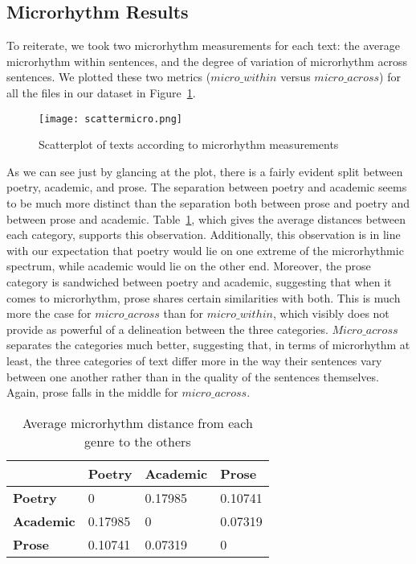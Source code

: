 \documentclass[pageno]{jpaper}
\begin{document}
\subsection{Microrhythm Results}
To reiterate, we took two microrhythm measurements for each text: the average microrhythm within sentences, and the degree of variation of microrhythm across sentences. We plotted these two metrics ($micro\_within$ versus $micro\_across$) for all the files in our dataset in Figure~\ref{fig:scattermicro}. 

\begin{figure}[hbt]
\centering
\texttt{[image: scattermicro.png]}
\caption{Scatterplot of texts according to microrhythm measurements}
\label{fig:scattermicro}
\end{figure}

As we can see just by glancing at the plot, there is a fairly evident split between poetry, academic, and prose. The separation between poetry and academic seems to be much more distinct than the separation both between prose and poetry and between prose and academic. Table~\ref{table:microresults}, which gives the average distances between each category, supports this observation. Additionally, this observation is in line with our expectation that poetry would lie on one extreme of the microrhythmic spectrum, while academic would lie on the other end. Moreover, the prose category is sandwiched between poetry and academic, suggesting that when it comes to microrhythm, prose shares certain similarities with both. This is much more the case for $micro\_across$ than for $micro\_within$, which visibly does not provide as powerful of a delineation between the three categories. $Micro\_across$ separates the categories much better, suggesting that, in terms of microrhythm at least, the three categories of text differ more in the way their sentences vary between one another rather than in the quality of the sentences themselves. Again, prose falls in the middle for $micro\_across$. 


\begin{table}[hbt]
  \centering
  \begin{tabular}{l l l l}
    \hline \hline
    &\textbf{Poetry}&\textbf{Academic}&\textbf{Prose} \\ [0.5ex] 
    \hline\hline
    \textbf{Poetry} & 0 & 0.17985 & 0.10741 \\
     \textbf{Academic} & 0.17985 & 0 & 0.07319 \\
     \textbf{Prose} & 0.10741 & 0.07319 & 0 \\
    \hline
  \end{tabular}
  \caption{Average microrhythm distance from each genre to the others}
  \label{table:microresults}
\end{table}
\end{document}

